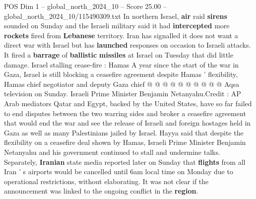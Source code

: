 \begin{textsample}{POS Dim 1 – global\_north\_2024\_10 – Score 25.00 – global\_north\_2024\_10/115490309.txt}
In northern Israel, \textbf{air} raid \textbf{sirens} sounded on Sunday and the Israeli military said it had \textbf{intercepted} more \textbf{rockets} fired from \textbf{Lebanese} territory.
Iran has signalled it does not want a direct war with Israel but has \textbf{launched} responses on occasion to Israeli attacks.
It fired a \textbf{barrage} of \textbf{ballistic} \textbf{missiles} at Israel on Tuesday that did little damage.
Israel stalling cease-fire : Hamas A year since the start of the war in Gaza, Israel is still blocking a ceasefire agreement despite Hamas ' flexibility, Hamas chief negotiator and deputy Gaza chief @ @ @ @ @ @ @ @ @ @ Aqsa television on Sunday.
Israeli Prime Minister Benjamin Netanyahu.Credit : AP Arab mediators Qatar and Egypt, backed by the United States, have so far failed to end disputes between the two warring sides and broker a ceasefire agreement that would end the war and see the release of Israeli and foreign hostages held in Gaza as well as many Palestinians jailed by Israel.
Hayya said that despite the flexibility on a ceasefire deal shown by Hamas, Israeli Prime Minister Benjamin Netanyahu and his government continued to stall and undermine talks.
Separately, \textbf{Iranian} state media reported later on Sunday that \textbf{flights} from all Iran ' s airports would be cancelled until 6am local time on Monday due to operational restrictions, without elaborating.
It was not clear if the announcement was linked to the ongoing conflict in the \textbf{region}.

\end{textsample}
